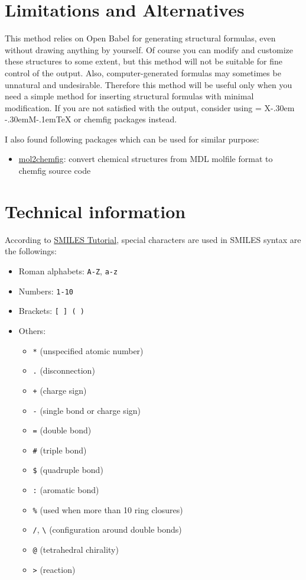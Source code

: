 \documentclass[12pt]{ltjsarticle}
\def\XyM{\ifnum\fam=-1\relax\fam=0\relax\fi\TestCount=\fam
  X\kern-.30em\smash{\raise.50ex\hbox{$\fam\TestCount\Upsilon$}}%
  \kern-.30em{M}}
\def\XyMTeX{\XyM\kern-.1em\TeX}
\def\Lpack#1{\textsf{#1}}
\begin{document}
\clearpage

\section{Limitations and Alternatives}

This method relies on Open Babel for generating structural formulas,
even without drawing anything by yourself.
Of course you can modify and customize these structures to some extent,
but this method will not be suitable for fine control of the output.
Also, computer-generated formulas may sometimes be unnatural and undesirable.
Therefore this method will be useful only when you need a simple method
for inserting structural formulas with minimal modification.
If you are not satisfied with the output, consider using {\XyMTeX} or
\Lpack{chemfig} packages instead.

I also found following packages which can be used for similar purpose:
\begin{itemize}
  \item \href{http://www.ctan.org/pkg/mol2chemfig}{\Lpack{mol2chemfig}}:
    convert chemical structures from MDL molfile format
    to \Lpack{chemfig} source code
\end{itemize}

\clearpage

\section{Technical information}
\label{detail}

According to
\href{http://www.daylight.com/meetings/summerschool98/course/dave/smiles-intro.html}{SMILES Tutorial},
special characters are used in SMILES syntax are the followings:
\begin{itemize}
\item Roman alphabets: \verb|A-Z|, \verb|a-z|
\item Numbers: \verb|1-10|
\item Brackets: \verb|[ ] ( )|
\item Others:
\begin{itemize}
\item \verb|*| (unspecified atomic number)
\item \verb|.| (disconnection)
\item \verb|+| (charge sign)
\item \verb|-| (single bond or charge sign)
\item \verb|=| (double bond)
\item \verb|#| (triple bond)
\item \verb|$| (quadruple bond)
\item \verb|:| (aromatic bond)
\item \verb|%| (used when more than 10 ring closures)
\item \verb|/|, \verb|\| (configuration around double bonds)
\item \verb|@| (tetrahedral chirality)
\item \verb|>| (reaction)
\end{itemize}
\end{itemize}
\end{document}

